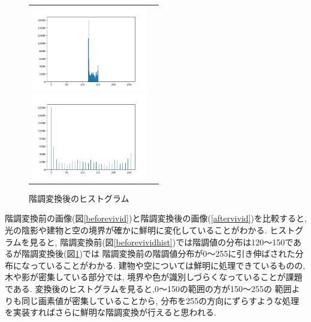 \documentclass[a4paper,11pt,uplatex, titlepage]{jsarticle}
\begin{document}
\begin{figure}[H]
  \begin{tabular}{cc}
    \begin{minipage}{0.5\hsize}
      \begin{center}
        \includegraphics[width = 5cm]{pic/kadai6hist1.png}
        \caption{階調変換前のヒストグラム}
        \label{beforevividhist}
      \end{center}
    \end{minipage}

    \begin{minipage}{0.5\hsize}
      \begin{center}
        \includegraphics[width = 5cm]{pic/kadai6hist2.png}
        \caption{階調変換後のヒストグラム}
        \label{aftervividhist}
      \end{center}
    \end{minipage}
  \end{tabular}
\end{figure}

階調変換前の画像(図\ref{beforevivid})と階調変換後の画像(\ref{aftervivid})を比較すると,
光の陰影や建物と空の境界が確かに鮮明に変化していることがわかる. ヒストグラムを見ると,
階調変換前(図\ref{beforevividhist})では階調値の分布は120〜150であるが階調変換後(図\ref{aftervividhist})では
階調変換前の階調値分布が0〜255に引き伸ばされた分布になっていることがわかる.
建物や空については鮮明に処理できているものの, 木や影が密集している部分では, 境界や色が識別しづらくなっていることが課題である.
変換後のヒストグラムを見ると,0〜150の範囲の方が150〜255の 範囲よりも同じ画素値が密集していることから,
分布を255の方向にずらすような処理を実装すればさらに鮮明な階調変換が行えると思われる.
\end{document}
